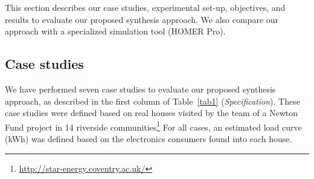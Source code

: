 \documentclass[journal]{IEEEtran}
\begin{document}
This section describes our case studies, experimental set-up,  objectives, and results to evaluate our proposed synthesis approach. We also compare our approach with a specialized simulation tool (HOMER Pro).

\subsection{Case studies} 

We have performed seven case studies to evaluate our proposed synthesis approach, as described in the first column of Table~\ref{tab1} (\textit{Specification}). These case studies were defined based on real houses visited by the team of a Newton Fund project in 14 riverside communities\footnote{\url{http://star-energy.coventry.ac.uk/}} For all cases, an estimated load curve (kWh) was defined based on the electronics consumers found into each house.
\end{document}
